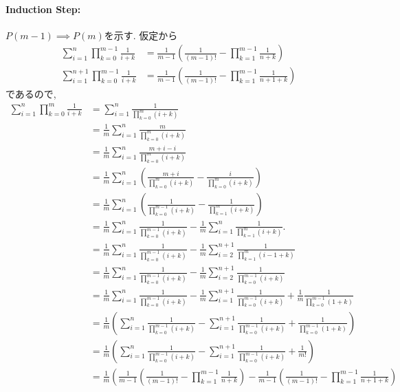 \begin{proof*}
  \paragraph{Induction Step:}
  $P(m-1)\implies P(m)$を示す.
  仮定から
  \begin{align*}
    \sum_{i=1}^n\prod_{k=0}^{m-1}\frac{1}{i+k}&=\frac{1}{m-1}\left(\frac{1}{(m-1)!}-\prod_{k=1}^{m-1}\frac{1}{n+k}\right)
\\  
    \sum_{i=1}^{n+1}\prod_{k=0}^{m-1}\frac{1}{i+k}&=\frac{1}{m-1}\left(\frac{1}{(m-1)!}-\prod_{k=1}^{m-1}\frac{1}{n+1+k}\right)
  \end{align*}
  であるので,
  \begin{align*}
    \sum_{i=1}^n\prod_{k=0}^{m}\frac{1}{i+k}
    &=
    \sum_{i=1}^n\frac{1}{\prod_{k=0}^{m}(i+k)}\\
    &=
    \frac{1}{m}\sum_{i=1}^n\frac{m}{\prod_{k=0}^{m}(i+k)}\\
    &=
    \frac{1}{m}\sum_{i=1}^n\frac{m+i-i}{\prod_{k=0}^{m}(i+k)}\\
    &=
    \frac{1}{m}\sum_{i=1}^n\left(\frac{m+i}{\prod_{k=0}^{m}(i+k)}-\frac{i}{\prod_{k=0}^{m}(i+k)}\right)\\
    &=
    \frac{1}{m}\sum_{i=1}^n\left(\frac{1}{\prod_{k=0}^{m-1}(i+k)}-\frac{1}{\prod_{k=1}^{m}(i+k)}\right)\\
    &=
    \frac{1}{m}\sum_{i=1}^n\frac{1}{\prod_{k=0}^{m-1}(i+k)}-\frac{1}{m}\sum_{i=1}^n\frac{1}{\prod_{k=1}^{m}(i+k)}.\\
    &=
    \frac{1}{m}\sum_{i=1}^n\frac{1}{\prod_{k=0}^{m-1}(i+k)}-\frac{1}{m}\sum_{i=2}^{n+1}\frac{1}{\prod_{k=1}^{m}(i-1+k)}\\
    &=
    \frac{1}{m}\sum_{i=1}^n\frac{1}{\prod_{k=0}^{m-1}(i+k)}-\frac{1}{m}\sum_{i=2}^{n+1}\frac{1}{\prod_{k=0}^{m-1}(i+k)}\\
    &=
    \frac{1}{m}\sum_{i=1}^n\frac{1}{\prod_{k=0}^{m-1}(i+k)}-\frac{1}{m}\sum_{i=1}^{n+1}\frac{1}{\prod_{k=0}^{m-1}(i+k)}
    +\frac{1}{m}\frac{1}{\prod_{k=0}^{m-1}(1+k)}\\
    &=
    \frac{1}{m}\left(\sum_{i=1}^n\frac{1}{\prod_{k=0}^{m-1}(i+k)}-\sum_{i=1}^{n+1}\frac{1}{\prod_{k=0}^{m-1}(i+k)}
    +\frac{1}{\prod_{k=0}^{m-1}(1+k)}\right)\\
    &=
    \frac{1}{m}\left(\sum_{i=1}^n\frac{1}{\prod_{k=0}^{m-1}(i+k)}-\sum_{i=1}^{n+1}\frac{1}{\prod_{k=0}^{m-1}(i+k)}
    +\frac{1}{m!}\right)\\
    &=\frac{1}{m}\left(
    \frac{1}{m-1}\left(\frac{1}{(m-1)!}-\prod_{k=1}^{m-1}\frac{1}{n+k}\right)
    -\frac{1}{m-1}\left(\frac{1}{(m-1)!}-\prod_{k=1}^{m-1}\frac{1}{n+1+k}\right)

\end{align*}
\end{proof*}
